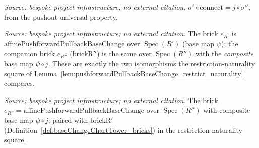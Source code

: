 \begin{lemma}
  \label{lem:baseChangeChartTower_inr_connect}
  \textit{Source: bespoke project infrastructure; no external citation.}
  \(\sigma' \circ \mathrm{connect} = j \circ \sigma''\), from the pushout
  universal property.
\end{lemma}

\begin{definition}
  \label{def:baseChangeChartTower_bricks}
  \textit{Source: bespoke project infrastructure; no external citation.}
  The brick \(e_{R'}\) is \(\mathrm{affinePushforwardPullbackBaseChange}\) over
  \(\operatorname{Spec}(R')\) (base map \(\psi\)); the companion brick \(e_{R''}\)
  (\(\mathrm{brickR''}\)) is the same over \(\operatorname{Spec}(R'')\) with the
  \emph{composite} base map \(\psi \circ j\). These are exactly the two isomorphisms the
  restriction-naturality square of
  Lemma~\ref{lem:pushforwardPullbackBaseChange_restrict_naturality} compares.
\end{definition}

\begin{definition}
  \label{def:baseChangeChartTower_brickRpp}
  \textit{Source: bespoke project infrastructure; no external citation.}
  The brick \(e_{R''} = \mathrm{affinePushforwardPullbackBaseChange}\) over
  \(\operatorname{Spec}(R'')\) with composite base map \(\psi \circ j\); paired with
  \(\mathrm{brickR'}\) (Definition~\ref{def:baseChangeChartTower_bricks}) in the
  restriction-naturality square.
\end{definition}

